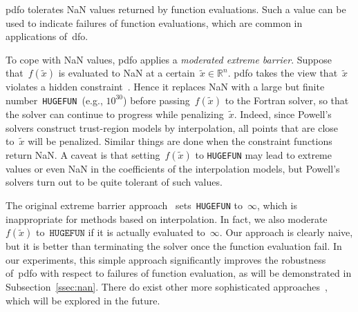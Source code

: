 \documentclass[
    smallextended,  %
    final,          %
]{svjour3}
\DeclareMathOperator\rank{rank}
\newcommand{\R}{\mathbb{R}}
\newcommand{\aeq}{A_{\scriptscriptstyle\mathcal{E}}}
\newcommand{\obj}{f}
\newcommand{\hugefun}{\texttt{HUGEFUN}\xspace}
\begin{document}
\gls{pdfo} tolerates NaN values returned by function evaluations. Such a value can be used to
indicate failures of function evaluations, which are common in applications of~\gls{dfo}.

To cope with NaN values, \gls{pdfo} applies a \emph{moderated extreme barrier}.
Suppose that~$\obj(\tilde{x})$ is evaluated to NaN at a certain~$\tilde{x}\in\R^n$.
\gls{pdfo} takes the view that~$\tilde{x}$ violates a hidden
constraint~\mbox{\cite{LeDigabel_Wild_2015,Audet_Caporossi_Jacquet_2020}}.
Hence it replaces NaN with a large but finite number~\hugefun~(e.g., $10^{30}$)
before passing~$\obj(\tilde{x})$ to the Fortran solver, so that the solver can continue to progress while
penalizing~$\tilde{x}$. Indeed, since Powell's solvers construct trust-region models by interpolation,
all points that are close to~$\tilde{x}$ will be penalized.
Similar things are done when the constraint functions return NaN.
A caveat is that setting~$\obj(\tilde{x})$ to \hugefun may lead to
extreme values or even NaN in the coefficients of the interpolation models, but Powell's solvers
turn out to be quite tolerant of such values.

The original extreme barrier approach~\cite[eq.~(13.2)]{Conn_Scheinberg_Vicente_2009b}
sets~\hugefun to~$\infty$, which is inappropriate for
methods based on interpolation. In fact, we also moderate~$\obj(\tilde{x})$ to~$\hugefun$ if it is
actually evaluated to~$\infty$.
Our approach is clearly naive, but it is better than terminating the solver once the function
evaluation fail. In our experiments, this simple approach significantly improves the robustness
of~\gls{pdfo} with respect to failures of function evaluation, as will be demonstrated in Subsection~\ref{ssec:nan}.
There do exist other more sophisticated approaches~\cite{Audet_Caporossi_Jacquet_2020},
which will be explored in the future.


\end{document}
